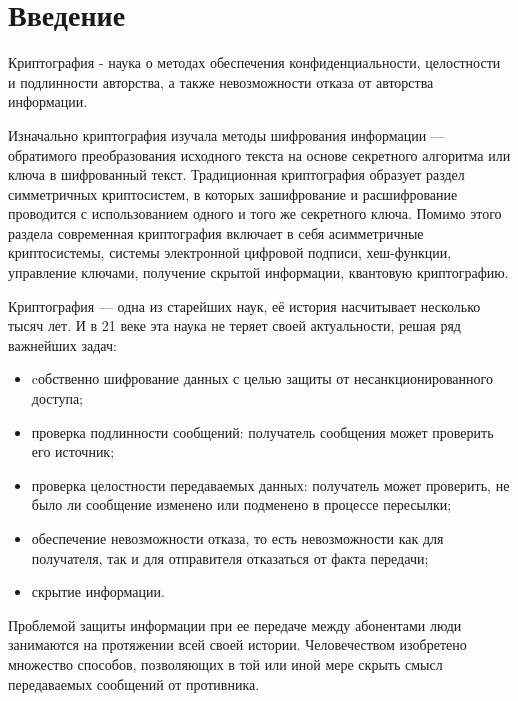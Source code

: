 





\section*{Введение}
Криптография - наука о методах обеспечения конфиденциальности, целостности и подлинности авторства, а также невозможности отказа от авторства информации.

Изначально криптография изучала методы шифрования информации — обратимого преобразования исходного текста на основе секретного алгоритма или ключа в шифрованный текст. Традиционная криптография образует раздел симметричных криптосистем, в которых зашифрование и расшифрование проводится с использованием одного и того же секретного ключа. Помимо этого раздела современная криптография включает в себя асимметричные криптосистемы, системы электронной цифровой подписи, хеш-функции, управление ключами, получение скрытой информации, квантовую криптографию.

Криптография — одна из старейших наук, её история насчитывает несколько тысяч лет. И в 21 веке эта наука не теряет своей актуальности, решая ряд важнейших задач:
\begin{itemize}
	\item cобственно шифрование данных с целью защиты от несанкционированного доступа;
	\item проверка подлинности сообщений: получатель сообщения может проверить его источник;
	\item проверка целостности передаваемых данных: получатель может проверить, не было ли сообщение изменено или подменено в процессе пересылки;
	\item обеспечение невозможности отказа, то есть невозможности как для получателя, так и для отправителя отказаться от факта передачи;
	\item скрытие информации.
\end{itemize}

Проблемой защиты информации при ее передаче между абонентами люди занимаются на протяжении всей своей истории. Человечеством изобретено множество способов, позволяющих в той или иной мере скрыть смысл передаваемых сообщений от противника.



